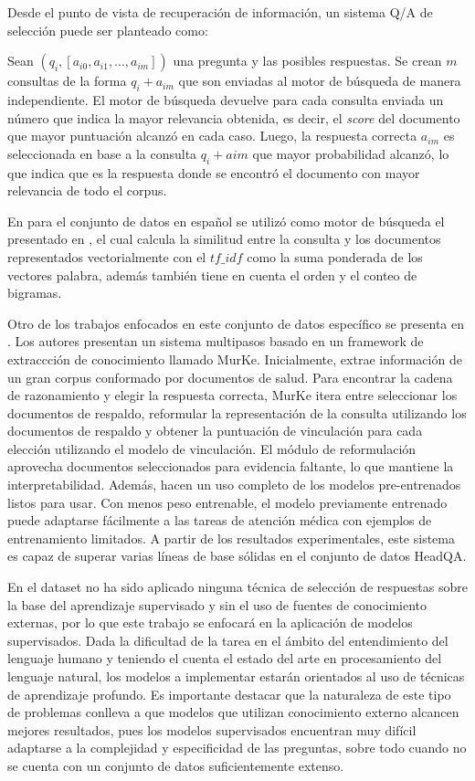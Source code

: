 Desde el punto de vista de recuperación de información, un sistema Q/A de selección puede ser planteado como: 

Sean $(q_{i}, [a_{i0}, a_{i1}, ..., a_{im}])$ una pregunta y las posibles respuestas. Se crean $m$ consultas de la forma $q_{i} + a_{im}$ que son enviadas al motor de búsqueda de manera independiente. El motor de búsqueda devuelve para cada consulta enviada un número que indica la mayor relevancia obtenida, es decir, el \textit{score} del documento que mayor puntuación alcanzó en cada caso. Luego, la respuesta correcta $a_{im}$ es seleccionada en base a la consulta $q_{i} + a{i}{m}$ que mayor probabilidad alcanzó, lo que indica que es la respuesta donde se encontró el documento con mayor relevancia de todo el corpus. 

En \cite{2019-head-qa} para el conjunto de datos en español se utilizó como motor de búsqueda el presentado en \cite{2017-chen-wikipedia}, el cual calcula la similitud entre la consulta y los documentos representados vectorialmente con el $tf\_idf$ como la suma ponderada de los vectores palabra, además también tiene en cuenta el orden y el conteo de bigramas.

Otro de los trabajos enfocados en este conjunto de datos específico se presenta en \cite{2020-multi-step}. Los autores presentan un sistema multipasos basado en un framework de extraccción de conocimiento llamado MurKe. Inicialmente, extrae información de un gran corpus conformado por documentos de salud. Para encontrar la cadena de razonamiento y elegir la respuesta correcta, MurKe itera entre seleccionar los documentos de respaldo, reformular la representación de la consulta utilizando los documentos de respaldo y obtener la puntuación de vinculación para cada elección utilizando el modelo de vinculación. El módulo de reformulación aprovecha documentos seleccionados para evidencia faltante, lo que mantiene la interpretabilidad. Además, hacen un uso completo de los modelos pre-entrenados listos para usar. Con menos peso entrenable, el modelo previamente entrenado puede adaptarse fácilmente a las tareas de atención médica con ejemplos de entrenamiento limitados. A partir de los resultados experimentales, este sistema es capaz de superar varias líneas de base sólidas en el conjunto de datos HeadQA. 

En el dataset no ha sido aplicado ninguna técnica de selección de respuestas sobre la base del aprendizaje supervisado y sin el uso de fuentes de conocimiento externas, por lo que este trabajo se enfocará en la aplicación de modelos supervisados. Dada la dificultad de la tarea en el ámbito del entendimiento del lenguaje humano y teniendo el cuenta el estado del arte en procesamiento del lenguaje natural, los modelos a implementar estarán orientados al uso de técnicas de aprendizaje profundo. Es importante destacar que la naturaleza de este tipo de problemas conlleva a que modelos que utilizan conocimiento externo alcancen mejores resultados, pues los modelos supervisados encuentran muy difícil adaptarse a la complejidad y especificidad de las preguntas, sobre todo cuando no se cuenta con un conjunto de datos suficientemente extenso.

